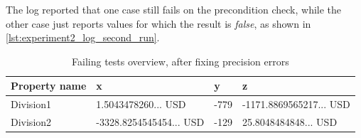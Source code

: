 The log reported that one case still fails on the precondition check, while the
other case just reports values for which the result is \textit{false}, as shown
in \autoref{lst:experiment2_log_second_run}.
\FloatBarrier
\begin{table}[!ht]
\centering
\begin{tabular}{llll}
\hline
\textbf{Property name} & \textbf{x}                               & \textbf{y} & \textbf{z}                               \\ \hline
Division1              & 1.5043478260... USD     & -779       & -1171.8869565217... USD \\
Division2              & -3328.8254545454... USD & -129       & 25.8048484848... USD    \\ \hline
\end{tabular}
\caption{Failing tests overview, after fixing precision errors}
\label{tbl:experiment2_overview_second_run}
\end{table}
\FloatBarrier

